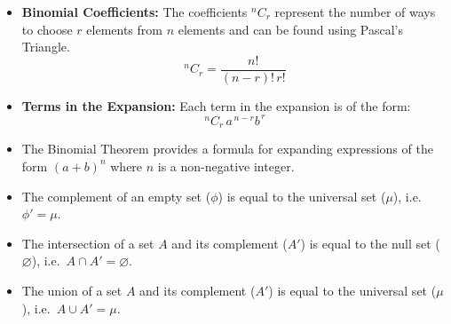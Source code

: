 \begin{keyideas}
\begin{itemize}
  \item \textbf{Binomial Coefficients:} The coefficients $^{n}C_{r}$ represent the number of ways
  to choose $r$ elements from $n$ elements and can be found using Pascal's
  Triangle.
  \[
    {}^{n}C_{r} = \frac{n!}{(n-r)!\,r!}
  \]
  \item \textbf{Terms in the Expansion:} Each term in the expansion is of the form:
  \[
    {}^{n}C_{r}\, a^{\,n-r} b^{\,r}
  \]
  \item The Binomial Theorem provides a formula for expanding expressions of
  the form $(a+b)^n$ where $n$ is a non-negative integer.
  \item The complement of an empty set ($\phi$) is equal to the universal set ($\mu$), i.e.\ $\phi' = \mu$.
  \item The intersection of a set $A$ and its complement ($A'$) is equal to the null set
  ($\varnothing$), i.e.\ $A \cap A' = \varnothing$.
  \item The union of a set $A$ and its complement ($A'$) is equal to the universal set
  ($\mu$), i.e.\ $A \cup A' = \mu$.
\end{itemize}
\end{keyideas}
